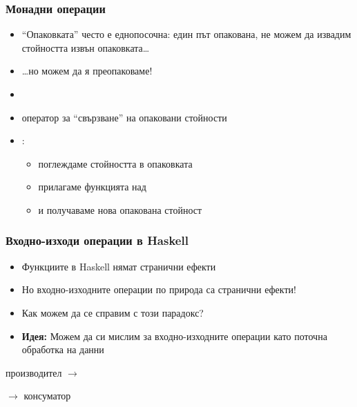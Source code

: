 \documentclass[alsotrans]{beamerswitch}
\begin{document}
\begin{frame}
  \frametitle{Монадни операции}

  \begin{itemize}[<+->]
  \item ``Опаковката'' често е \alert{еднопосочна}: един път опакована, не можем да извадим стойността извън опаковката\ldots
  \item \ldots но можем да я преопаковаме!
  \item {}
  \item оператор за ``свързване'' на опаковани стойности
  \item {}:
    \begin{itemize}
    \item поглеждаме стойността  в опаковката 
    \item прилагаме функцията  над 
    \item и получаваме нова опакована стойност 
    \end{itemize}
  \end{itemize}
\end{frame}

\begin{frame}
  \frametitle{Входно-изходи операции в Haskell}

  \begin{itemize}[<+->]
  \item Функциите в Haskell нямат странични ефекти
  \item Но входно-изходните операции по природа са странични ефекти!
  \item Как можем да се справим с този парадокс?
  \item \textbf{Идея:} Можем да си мислим за входно-изходните операции като поточна обработка на данни
  \end{itemize}
  \onslide<+->
  \begin{center}
    производител
    $\longrightarrow$
     $\longrightarrow$ консуматор
  \end{center}
\end{frame}
\end{document}

